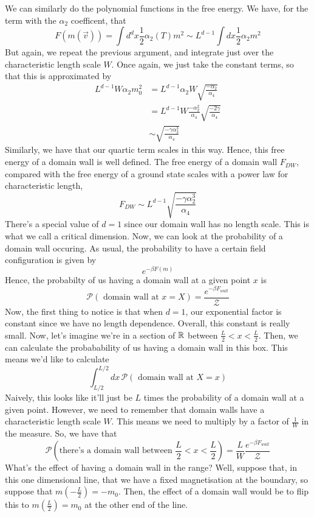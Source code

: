 We can similarly do the polynomial functions in the free energy. 
We have, for the term with the $\alpha_2 $ coefficent, that 
\[
	F ( m ( \vec{v}) )  = \int d^{d }x \frac{1}{2 } \alpha_2( T ) m^ 2 \sim L^{d - 1} \int dx \frac{1}{2} \alpha_2 m^ 2
\] But again, we repeat the previous argument, 
and integrate just over the characteristic length scale $W$. 
Once again, we just take the constant terms, so that this 
is approximated by 
\begin{align*}
	L^{d - 1} W \alpha_2 m_{0}^2 &= L^{d - 1}\alpha_2W \sqrt{\frac{-\alpha_2}{\alpha_4}}  \\
	&= L^{d -1} W \frac{ - \alpha_2^2 }{\alpha_4 } \sqrt{\frac{ - 2 \gamma }{\alpha_4}}  \\
	& \sim \sqrt{ \frac{ - \gamma \alpha_2^3 }{\alpha_4 }} 
\end{align*}
Similarly, we have that our quartic term scales in this way. 
Hence, this free energy of a domain wall is well defined. 
The free energy of a domain wall $F_{DW}$, compared with the free energy of a ground state scales with a power law for characteristic length, 
\[ 
F_{ DW} \sim L^{ d - 1} \sqrt{ \frac{  - \gamma \alpha_2^3 }{ \alpha_4} } 
\] 
There's a special value of $d = 1$ since our domain wall has no length scale. 
This is what we call a critical dimension. 
Now, we can look at the probability of a domain wall occuring. 
As usual, the probability to have a certain field configuration is 
given by 
\[
	e^{  - \beta F ( m ) }
\] Hence, the probabilty of us having a domain wall at a given point $ x $ is 
\[
	\mathcal{  P}(\text{ domain wall at } x = X )  = \frac{e^{- \beta F_{wall}}}{\mathcal{ Z}}
\] Now, the first thing to notice is that when $ d= 1$, our exponential factor 
is constant since we have no length dependence. 
Overall, this constant is really small. Now, let's imagine 
we're in a section of  $ \mathbb{ R}$ between $ \frac{L}{ 2} < x < \frac{L}{2}$. 
Then, we can calculate the probabability of us having a domain wall in this box. 
This means we'd like to calculate 
\[
	\int_{L / 2 }^{ L / 2 } dx \, \mathcal{ P }( \text{ domain wall at } X = x ) 
\] Naively, this looks like it'll just be $ L $ times the probability of a domain wall at a given point. 
However, we need to remember that domain walls have a characteristic length scale  $W$. 
This means we need to multiply by a factor of $ \frac{1}{ W} $ in the measure. 
So, we have that 
\[	\mathcal{ P }( \text{there's a domain wall between } \frac{L}{2 }< x < \frac{L}{2} )  = \frac{L}{W} \frac{e^{ - \beta F_{ wall}}}{ \mathcal{ Z }} 
\] What's the effect of having a domain wall in the range? 
Well, suppose that, in this one dimensional line, that we have a 
fixed magnetisation at the boundary, so suppose that $ m (  - \frac{L}{2 }) =  - m_{0 } $.
Then, the effect of a domain wall would be to flip this to $ m ( \frac{L}{2 })  = m_{ 0 } $ 
at the other end of the line. 

